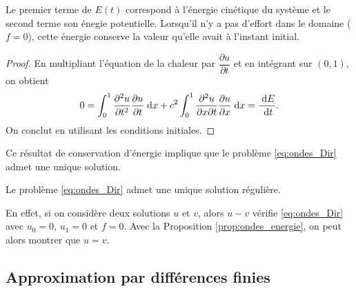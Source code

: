 \documentclass[12pt,a4paper,twoside]{article}
\begin{document}
Le premier terme de $E(t)$ correspond \`a l'\'energie
cin\'etique du syst\`eme et le second terme son \'enegie potentielle.
Lorsqu'il n'y a pas d'effort dans le domaine ($f=0$),
cette \'energie conserve la valeur qu'elle avait \`a l'instant initial.

\begin{proof}
  En multipliant l'\'equation de la chaleur par $\dfrac{\partial u}{\partial t}$
  et en int\'egrant sur $(0,1)$, on obtient
  \begin{align*}
    0 = 
    \int_0^1 \dfrac{\partial^2 u}{\partial t^2} \dfrac{\partial u}{\partial t} \;\mathrm{d} x
    + c^2 
    \int_0^1 \dfrac{\partial^2 u}{\partial x \partial t} \dfrac{\partial u}{\partial x} \;\mathrm{d} x
    = \dfrac{\;\mathrm{d} E}{\;\mathrm{d} t} .
  \end{align*}
  On conclut en utilisant les conditions initiales.
\end{proof}

Ce r\'esultat de conservation d'\'energie implique que le probl\`eme 
\eqref{eq:ondes_Dir} admet une unique solution.
\begin{corrolary}
  Le probl\`eme \eqref{eq:ondes_Dir} admet une unique solution r\'eguli\`ere.
\end{corrolary}
En effet, si on consid\`ere deux solutions $u$ et $v$,
alors $u-v$ v\'erifie \eqref{eq:ondes_Dir} avec $u_0 = 0$, $u_1 = 0$ et $f=0$. 
Avec la Proposition \ref{prop:ondes_energie}, on peut alors
montrer que $u=v$.


\subsection{Approximation par diff\'erences finies}
\end{document}
